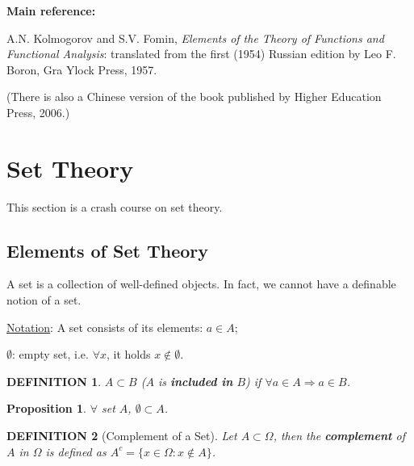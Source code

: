 \documentclass[12pt]{article}
\theoremstyle{blueplain}
\newtheorem{proposition}[theorem]{Proposition}
\theoremstyle{bluedef}
\newtheorem{definition}{DEFINITION}[section]
\theoremstyle{blueremark}
\numberwithin{equation}{section}
\begin{document}
\medskip

\vspace{2em}
\noindent\textbf{Main reference:}

\noindent A.N. Kolmogorov and S.V. Fomin, \textit{Elements of the Theory of Functions and Functional Analysis}: translated from the first (1954) Russian edition by Leo F. Boron, Gra Ylock Press, 1957.

\noindent (There is also a Chinese version of the book published by Higher Education Press, 2006.)

\clearpage


\label{mytoc}

\onehalfspacing

\tableofcontents

\clearpage

\doublespacing


\section{Set Theory}

This section is a crash course on set theory.

\clearpage

\subsection{Elements of Set Theory}

A set is a collection of well-defined objects. In fact, we cannot have a definable notion of a set.

\underline{Notation}: A set consists of its elements: $a \in A$;

$\emptyset$: empty set, i.e. $\forall x$, it holds $x \notin \emptyset$.

\begin{definition}
  $A \subset B$ ($A$ is \textbf{included in} $B$) if $\forall a \in A \Rightarrow a \in B$.
\end{definition}

\begin{proposition}
  $\forall$ set $A$, $\emptyset \subset A$.
\end{proposition}

\begin{definition}[Complement of a Set]

  Let $A \subset \Omega$, then the \textbf{complement} of $A$ in $\Omega$ is defined as $A^c = \{x \in \Omega: x \notin A\}$.
\end{definition}
\end{document}
